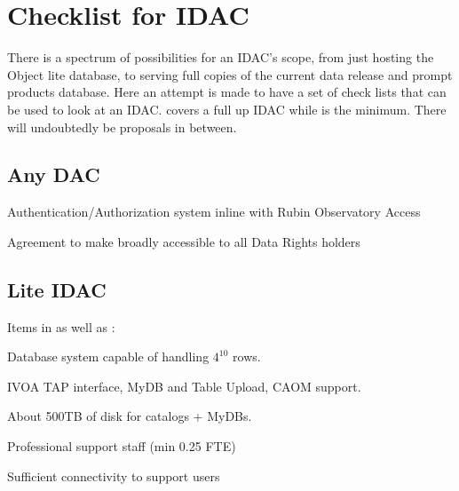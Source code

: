 
\section{Checklist for IDAC}\label{sec:checklist}

There is a spectrum of possibilities for an IDAC's scope, from just hosting the Object lite database, to serving full copies of the current data release and prompt products database.
Here an attempt is made to have a set of check lists  that can be used to look at an IDAC.
 covers a full up IDAC while   is the minimum.
There will undoubtedly be proposals in between.

\subsection{Any DAC} \label{sec:anyDAC}
\begin{todolist}
\item Authentication/Authorization system  inline with Rubin Observatory Access
\item Agreement to make broadly accessible to all Data Rights holders
\end{todolist}

\subsection{Lite IDAC} \label{sec:liteDAC}
Items in  as well as :
\begin{todolist}
\item Database system capable of handling $4^{10}$ rows.
\item IVOA TAP interface, MyDB and Table Upload, CAOM support.
\item About 500TB of disk for catalogs + MyDBs.
\item Professional support staff (min 0.25 FTE)
\item Sufficient connectivity to support users
\end{todolist}

